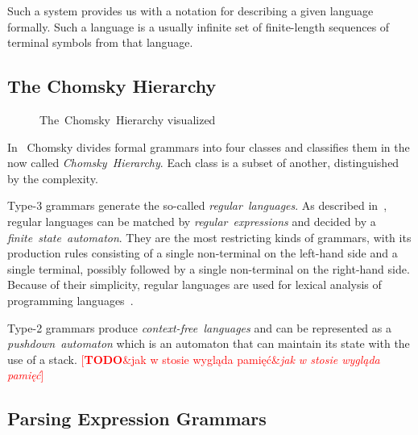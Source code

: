 \documentclass[english,engineering]{wizthesis}
\newcommand{\todo}[1]{%
  \textcolor{red}{[\textbf{TODO}\ifx&#1&{}\else{ }\fi\emph{#1}]}%
}
\begin{document}
Such a system provides us with a notation for describing a given
language formally. Such a language is a usually infinite set of finite-length
sequences of terminal symbols from that language.

\subsection{The Chomsky Hierarchy}

\begin{wrapfigure}{R}{0.45\textwidth}
  \centering
  \caption{The~Chomsky~Hierarchy visualized}
  \label{fig:chomsky-hierarchy}
\end{wrapfigure}

In~\cite{chomsky-1956} Chomsky divides formal grammars into four classes and
classifies them in the now called \emph{Chomsky~Hierarchy}. Each class is a
subset of another, distinguished by the complexity.

Type-3 grammars generate the so-called \emph{regular~languages}. As described
in~\cite{aho-1990}, regular languages can be matched by
\emph{regular~expressions} and decided by a \emph{finite~state~automaton}.
They are the most restricting kinds of grammars, with its production rules
consisting of a single non-terminal on the left-hand side and a single terminal,
possibly followed by a single non-terminal on the right-hand side. Because of
their simplicity, regular languages are used for lexical analysis of programming
languages~\cite{johnson-1968}.

Type-2 grammars produce \emph{context-free~languages} and can be represented
as a \emph{pushdown~automaton} which is an automaton that can maintain its
state with the use of a stack. \todo{jak w stosie wygląda pamięć}

\subsection{Parsing Expression Grammars}
\end{document}
